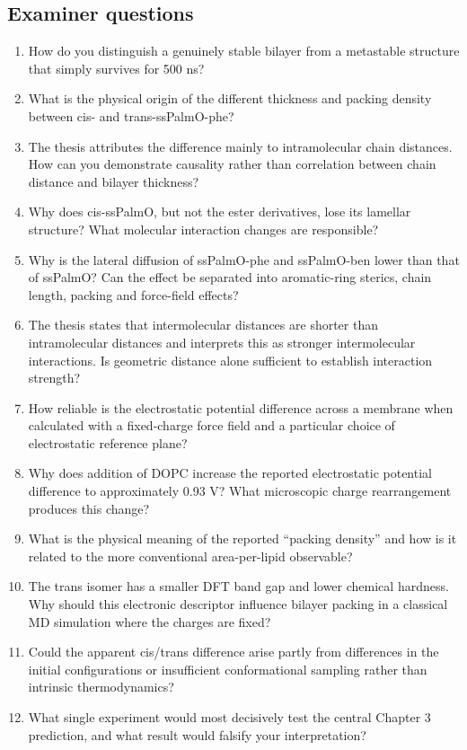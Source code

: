 \documentclass[11pt,a4paper]{article}
\begin{document}
\subsection*{Examiner questions}

\begin{enumerate}[leftmargin=*]
\item How do you distinguish a genuinely stable bilayer from a metastable structure that simply survives for 500 ns?
\item What is the physical origin of the different thickness and packing density between cis- and trans-ssPalmO-phe?
\item The thesis attributes the difference mainly to intramolecular chain distances. How can you demonstrate causality rather than correlation between chain distance and bilayer thickness?
\item Why does cis-ssPalmO, but not the ester derivatives, lose its lamellar structure? What molecular interaction changes are responsible?
\item Why is the lateral diffusion of ssPalmO-phe and ssPalmO-ben lower than that of ssPalmO? Can the effect be separated into aromatic-ring sterics, chain length, packing and force-field effects?
\item The thesis states that intermolecular distances are shorter than intramolecular distances and interprets this as stronger intermolecular interactions. Is geometric distance alone sufficient to establish interaction strength?
\item How reliable is the electrostatic potential difference across a membrane when calculated with a fixed-charge force field and a particular choice of electrostatic reference plane?
\item Why does addition of DOPC increase the reported electrostatic potential difference to approximately 0.93 V? What microscopic charge rearrangement produces this change?
\item What is the physical meaning of the reported ``packing density'' and how is it related to the more conventional area-per-lipid observable?
\item The trans isomer has a smaller DFT band gap and lower chemical hardness. Why should this electronic descriptor influence bilayer packing in a classical MD simulation where the charges are fixed?
\item Could the apparent cis/trans difference arise partly from differences in the initial configurations or insufficient conformational sampling rather than intrinsic thermodynamics?
\item What single experiment would most decisively test the central Chapter 3 prediction, and what result would falsify your interpretation?
\end{enumerate}
\end{document}
